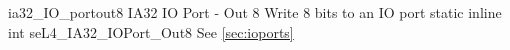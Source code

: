 %
%
%
%

\apidoc
{ia32_IO_portout8}
{IA32 IO Port - Out 8}
{Write 8 bits to an IO port}
{static inline int seL4\_IA32\_IOPort\_Out8 }
{
}
{\errorenumdesc}
{See \autoref{sec:ioports}}
